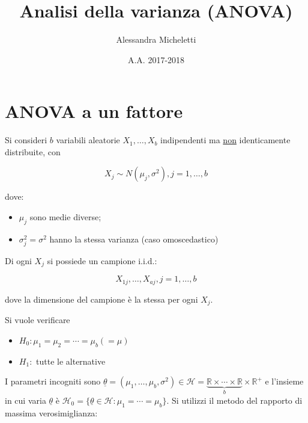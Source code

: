 \documentclass[hidelinks, 10pt]{article}
\author{Alessandra Micheletti}
\date{A.A. 2017-2018}
\title{Analisi della varianza (ANOVA)}
\begin{document}
\newcommand{\defeq}{\vcentcolon=}
\newcommand{\eqdef}{=\vcentcolon}
\providecommand{\ML}[1]{\hat{#1}_{\text{ML}}}
\providecommand{\compl}[1]{\prescript{c}{}{#1}}

\theoremstyle{plain}
\newtheorem{thm}{Teorema}[]

\theoremstyle{definition}
\newtheorem{defn}[]{Definizione}
\newtheorem{prop}[]{Proposizione}
\newtheorem{cor}[]{Corollario}
\newtheorem{lem}[]{Lemma}
\newtheorem{oss}[]{Osservazione}
\newtheorem{nota}[]{Nota}
\newtheorem{es}[]{Esempio}
\newtheorem{ex}[]{Esercizio}


\maketitle

\section{ANOVA a un fattore}
Si consideri $ b $ variabili aleatorie $ X_{1}, \dotsc, X_{b} $ indipendenti ma \underline{non} identicamente distribuite, con

\[ X_{j} \sim N(\mu_{j}, \sigma^{2}), j = 1, \dotsc, b \]

dove:
\begin{itemize}
\item $ \mu_{j} $ sono medie diverse;
\item $ \sigma^{2}_{j} = \sigma^{2} $ hanno la stessa varianza (caso omoscedastico)
\end{itemize}

Di ogni $ X_{j} $ si possiede un campione i.i.d.:

\[ X_{1j}, \dotsc, X_{aj}, j = 1, \dotsc, b \]

dove la dimensione del campione \`e la stessa per ogni $ X_{j} $.

Si vuole verificare
\begin{itemize}
\item $ H_{0}: \mu_{1} = \mu_{2} = \dotsb = \mu_{b} (= \mu) $
\item $ H_{1}: $ tutte le alternative
\end{itemize}

I parametri incogniti sono $ \underline{\theta} = (\mu_{1}, \dotsc, \mu_{b}, \sigma^{2}) \in \mathcal{H} = \underbrace{\mathbb{R} \times \dotsb \times \mathbb{R}}_{b} \times \mathbb{R}^{+} $ e l'insieme in cui varia $ \underline{\theta} $ \`e $ \mathcal{H}_{0} = \{ \underline{\theta} \in \mathcal{H} : \mu_{1} = \dotsb = \mu_{b} \} $. Si utilizzi il metodo del rapporto di massima verosimiglianza:
\end{document}
